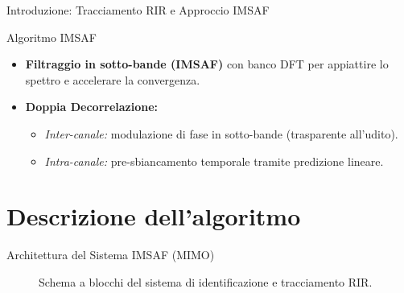 \documentclass[aspectratio=169,xcolor=dvipsnames]{beamer}
\begin{document}
\begin{frame}{Introduzione: Tracciamento RIR e Approccio IMSAF}
    \begin{exampleblock}{Algoritmo IMSAF}
        \begin{itemize}
            \item \textbf{Filtraggio in sotto-bande (IMSAF)} con banco DFT per appiattire lo spettro e accelerare la convergenza.
            \item \textbf{Doppia Decorrelazione:}
                \begin{itemize}
                    \item \textit{Inter-canale:} modulazione di fase in sotto-bande (trasparente all'udito).
                    \item \textit{Intra-canale:} pre-sbiancamento temporale tramite predizione lineare.
                \end{itemize}
        \end{itemize}
    \end{exampleblock}
\end{frame}


\section{Descrizione dell'algoritmo}
\begin{frame}{Architettura del Sistema IMSAF (MIMO)}
    \begin{figure}[htbp]
        \centering
    
    \caption{Schema a blocchi del sistema di identificazione e tracciamento RIR.}
    \end{figure}
\end{frame}
\end{document}
